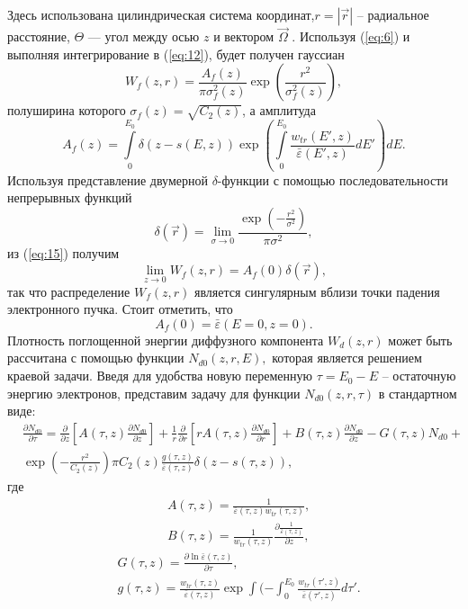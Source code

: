 Здесь использована цилиндрическая система координат,$r=|\vec{r}|$ -- радиальное
расстояние, $\Theta$ — угол между осью $z$ и вектором $\vec{\Omega}$ .
Используя (\ref{eq:6}) и выполняя интегрирование в (\ref{eq:12}), будет получен гауссиан
\begin{equation}
W_f(z,r)=\frac{A_f(z)}{\pi \sigma_f^2(z)} \exp \left(\frac{r^2}{\sigma_f^2(z)}\right),
\label{eq:15}
\end{equation}
полуширина которого $\sigma_f(z)=\sqrt{C_2 (z)}$, а амплитуда
\begin{equation}
A_f(z) = \int\limits_0^{E_0}\delta( z − s(E, z))\exp\left(\int\limits_0^{E_0}\frac{w_{tr} ( E′, z)}{\bar{\varepsilon}(E′, z)}dE′\right) dE.
\label{eq:16}
\end{equation}
Используя представление двумерной \(\delta\)-функции с помощью последовательности непрерывных функций \cite{korn}
\begin{equation}
\delta(\vec{r}) = \lim_{\sigma\rightarrow0} \frac{\exp\left(−\frac{r^2}{\sigma^2}\right)}{\pi\sigma^2},
\end{equation}
из (\ref{eq:15}) получим
\begin{equation}
\lim_{z\rightarrow0} W_f(z, r) = A_f(0)\delta(\vec{r}),
\end{equation}
так что распределение \( W_f(z, r) \) является сингулярным вблизи точки падения
электронного пучка. Стоит отметить, что
\begin{equation}
    A_f(0) = \bar{\varepsilon}(E=0, z=0).    
\end{equation}
Плотность поглощенной энергии диффузного компонента \(W_d(z, r)\) может быть
рассчитана с помощью функции \(N_{d0}(z, r, E),\) которая является решением краевой задачи.
Введя для удобства новую переменную \(\tau=E_0-E\) -- остаточную энергию электронов,
представим задачу для функции \(N_{d0}(z, r, \tau)\) в стандартном виде:
\begin{align}
& \frac{\partial N_{d0}}{\partial\tau} = \frac{\partial}{\partial z}\left[A (\tau , z )\frac{\partial N_{d0}}{\partial z}\right]
+ \frac{1}{r}\frac{\partial}{\partial r}\left[rA(\tau, z)
\frac{\partial N_{d0}}{\partial r}\right] + B (\tau , z )
\frac{\partial N_{d0}}{\partial z} − G (\tau , z )N_{d0}
+ \\
& \exp\left( −\frac{r^2}{C_2(z)}\right)\pi C_2(z)\frac{g(\tau, z)}{\bar{\varepsilon} (\tau , z ) }\delta ( z − s(\tau , z )),
\nonumber
\label{eq:19}
\end{align}
где
\begin{align}
& A (\tau, z) = \frac{1}{\bar{\varepsilon}(\tau, z)w_{tr} (\tau, z)}, \\
& B (\tau, z) = \frac{1}{w_{tr}(\tau, z)}\frac{\partial\frac{1}{\bar{\varepsilon}(\tau, z)}}{\partial z},
\end{align}
\begin{align}
& G (\tau, z) = \frac{\partial\ln\bar{\varepsilon}(\tau, z )}{\partial\tau},\\
& g(\tau, z) = \frac{w_{tr}(\tau , z )}{\bar{\varepsilon} (\tau , z )}\exp\int( −\int_0^{E_0} \frac{w_{tr}(\tau′, z )}{\bar{\varepsilon} (\tau′, z)}d\tau′.    
\end{align}

